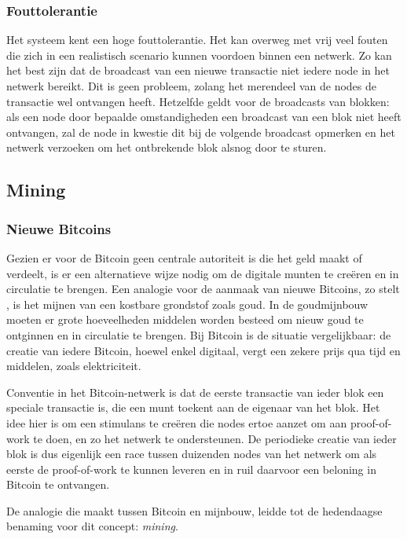		\subsubsection{Fouttolerantie}
		Het systeem kent een hoge fouttolerantie. Het kan overweg met vrij veel fouten die zich in een realistisch scenario kunnen voordoen binnen een netwerk. Zo kan het best zijn dat de broadcast van een nieuwe transactie niet iedere node in het netwerk bereikt. Dit is geen probleem, zolang het merendeel van de nodes de transactie wel ontvangen heeft. Hetzelfde geldt voor de broadcasts van blokken: als een node door bepaalde omstandigheden een broadcast van een blok niet heeft ontvangen, zal de node in kwestie dit bij de volgende broadcast opmerken en het netwerk verzoeken om het ontbrekende blok alsnog door te sturen.
	\subsection{Mining}
		\subsubsection{Nieuwe Bitcoins}
		Gezien er voor de Bitcoin geen centrale autoriteit is die het geld maakt of verdeelt, is er een alternatieve wijze nodig om de digitale munten te creëren en in circulatie te brengen. Een analogie voor de aanmaak van nieuwe Bitcoins, zo stelt \textcite{Nakamoto2008}, is het mijnen van een kostbare grondstof zoals goud. In de goudmijnbouw moeten er grote hoeveelheden middelen worden besteed om nieuw goud te ontginnen en in circulatie te brengen. Bij Bitcoin is de situatie vergelijkbaar: de creatie van iedere Bitcoin, hoewel enkel digitaal, vergt een zekere prijs qua tijd en middelen, zoals elektriciteit.
		
		Conventie in het Bitcoin-netwerk is dat de eerste transactie van ieder blok een speciale transactie is, die een munt toekent aan de eigenaar van het blok. Het idee hier is om een stimulans te creëren die nodes ertoe aanzet om aan proof-of-work te doen, en zo het netwerk te ondersteunen. De periodieke creatie van ieder blok is dus eigenlijk een race tussen duizenden nodes van het netwerk om als eerste de proof-of-work te kunnen leveren en in ruil daarvoor een beloning in Bitcoin te ontvangen. 
		
		De analogie die \textcite{Nakamoto2008} maakt tussen Bitcoin en mijnbouw, leidde tot de hedendaagse benaming voor dit concept: \textit{mining}. 
		
